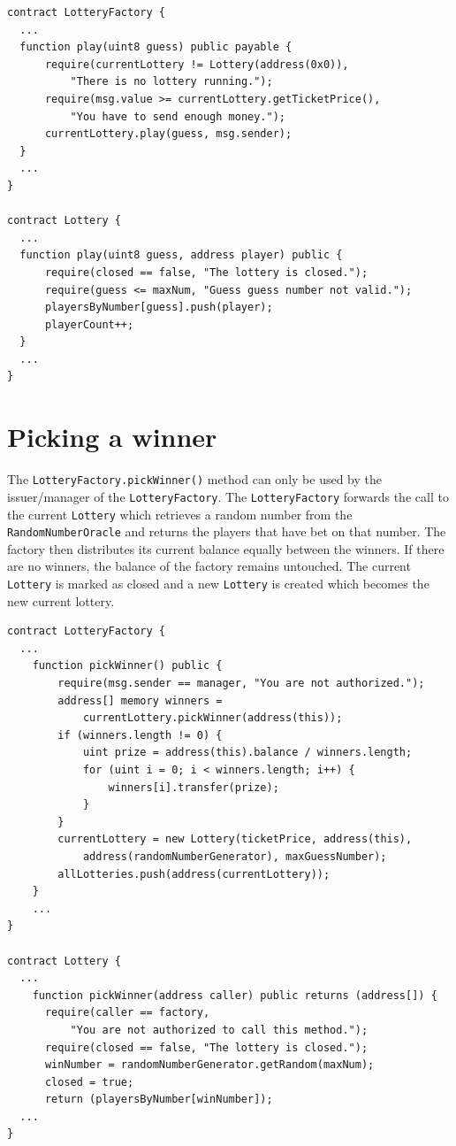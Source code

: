 \begin{Verbatim}[fontsize=\tiny]
contract LotteryFactory {
  ...
  function play(uint8 guess) public payable {
      require(currentLottery != Lottery(address(0x0)), 
          "There is no lottery running.");
      require(msg.value >= currentLottery.getTicketPrice(), 
          "You have to send enough money.");
      currentLottery.play(guess, msg.sender);
  }
  ...
}

contract Lottery {
  ...
  function play(uint8 guess, address player) public {
      require(closed == false, "The lottery is closed.");
      require(guess <= maxNum, "Guess guess number not valid.");
      playersByNumber[guess].push(player);
      playerCount++;
  }
  ...
}
\end{Verbatim}


\section{Picking a winner}

The \texttt{LotteryFactory.pickWinner()} method can only be used by the
issuer/manager of the \texttt{LotteryFactory}. The \texttt{LotteryFactory}
forwards the call to the current \texttt{Lottery} which retrieves a random
number from the \texttt{RandomNumberOracle} and returns the players that have
bet on that number. The factory then distributes its current balance equally
between the winners. If there are no winners, the balance of the factory remains
untouched. The current \texttt{Lottery} is marked as closed and a new
\texttt{Lottery} is created which becomes the new current lottery.

\begin{Verbatim}[fontsize=\tiny]
contract LotteryFactory {
  ...
    function pickWinner() public {
        require(msg.sender == manager, "You are not authorized.");
        address[] memory winners = 
            currentLottery.pickWinner(address(this));
        if (winners.length != 0) {
            uint prize = address(this).balance / winners.length;
            for (uint i = 0; i < winners.length; i++) {
                winners[i].transfer(prize);
            }
        }
        currentLottery = new Lottery(ticketPrice, address(this), 
            address(randomNumberGenerator), maxGuessNumber);
        allLotteries.push(address(currentLottery));
    }
    ...
}

contract Lottery {
  ...
    function pickWinner(address caller) public returns (address[]) {
      require(caller == factory, 
          "You are not authorized to call this method.");
      require(closed == false, "The lottery is closed.");
      winNumber = randomNumberGenerator.getRandom(maxNum);
      closed = true;
      return (playersByNumber[winNumber]);
  ...
}

\end{Verbatim}
